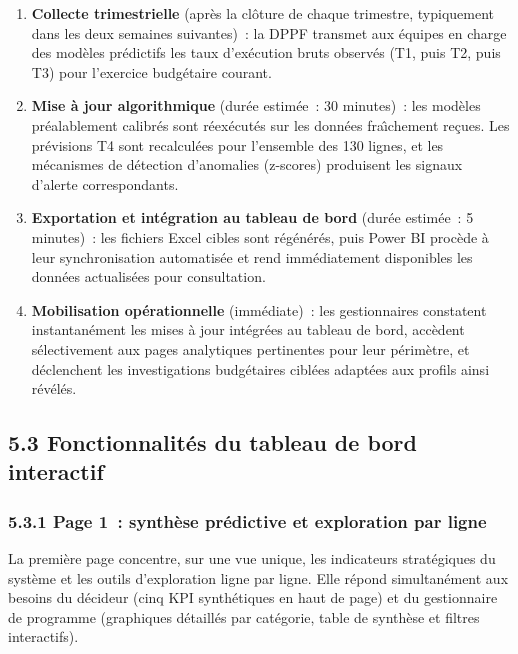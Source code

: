 \begin{enumerate}
    \item \textbf{Collecte trimestrielle} (apr\`es la cl\^oture de chaque trimestre,
    typiquement dans les deux semaines suivantes)~: la DPPF transmet aux \'equipes
    en charge des mod\`eles pr\'edictifs les taux d'ex\'ecution bruts observ\'es
    (T1, puis T2, puis T3) pour l'exercice budg\'etaire courant.
    \item \textbf{Mise \`a jour algorithmique} (dur\'ee estim\'ee~: 30 minutes)~: les mod\`eles
    pr\'ealablement calibr\'es sont r\'eex\'ecut\'es sur les donn\'ees fra\^{\i}chement re\c{c}ues.
    Les pr\'evisions T4 sont recalcul\'ees pour l'ensemble des 130 lignes, et les m\'ecanismes
    de d\'etection d'anomalies (z-scores) produisent les signaux d'alerte correspondants.
    \item \textbf{Exportation et int\'egration au tableau de bord} (dur\'ee estim\'ee~:
    5 minutes)~: les fichiers Excel cibles sont r\'eg\'en\'er\'es, puis Power BI proc\`ede
    \`a leur synchronisation automatis\'ee et rend imm\'ediatement disponibles les donn\'ees
    actualis\'ees pour consultation.
    \item \textbf{Mobilisation op\'erationnelle} (imm\'ediate)~: les gestionnaires constatent
    instantan\'ement les mises \`a jour int\'egr\'ees au tableau de bord, acc\`edent
    s\'electivement aux pages analytiques pertinentes pour leur p\'erim\`etre, et d\'eclenchent
    les investigations budg\'etaires cibl\'ees adapt\'ees aux profils ainsi r\'ev\'el\'es.
\end{enumerate}

\subsection*{5.3 \quad Fonctionnalit\'es du tableau de bord interactif}

\subsubsection*{5.3.1 \quad Page 1~: synth\`ese pr\'edictive et exploration par ligne}

La premi\`ere page concentre, sur une vue unique, les indicateurs strat\'egiques
du syst\`eme et les outils d'exploration ligne par ligne. Elle r\'epond simultan\'ement
aux besoins du d\'ecideur (cinq KPI synth\'etiques en haut de page) et du gestionnaire
de programme (graphiques d\'etaill\'es par cat\'egorie, table de synth\`ese et filtres
interactifs).

